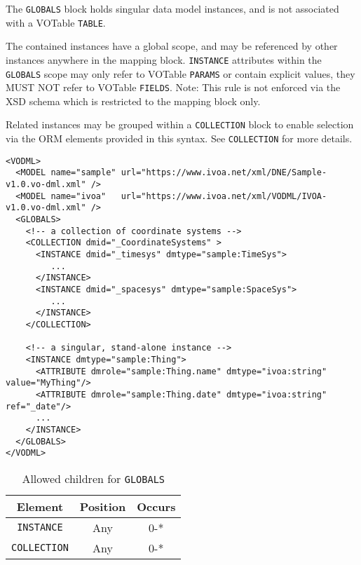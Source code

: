The \texttt{GLOBALS} block holds singular data model instances, and is not associated 
with a VOTable \texttt{TABLE}.

The contained instances have a global scope, and may be
referenced by other instances anywhere in the mapping block.  \texttt{INSTANCE} attributes
within the \texttt{GLOBALS} scope may only refer to VOTable \texttt{PARAMS} or contain
explicit values, they MUST NOT refer to VOTable \texttt{FIELDS}.  Note: This rule is not enforced
via the XSD schema which is restricted to the mapping block only.

Related instances may be grouped within a \texttt{COLLECTION} block to enable selection
via the ORM elements provided in this syntax.  See \texttt{COLLECTION} for more details.

\begin{lstlisting}[frame=single,caption={Example \texttt{GLOBALS} block},style=XML,basicstyle=\tiny]
<VODML>
  <MODEL name="sample" url="https://www.ivoa.net/xml/DNE/Sample-v1.0.vo-dml.xml" />
  <MODEL name="ivoa"   url="https://www.ivoa.net/xml/VODML/IVOA-v1.0.vo-dml.xml" />
  <GLOBALS>
    <!-- a collection of coordinate systems -->
    <COLLECTION dmid="_CoordinateSystems" >
      <INSTANCE dmid="_timesys" dmtype="sample:TimeSys">
         ...
      </INSTANCE>
      <INSTANCE dmid="_spacesys" dmtype="sample:SpaceSys">
         ...
      </INSTANCE>
    </COLLECTION>

    <!-- a singular, stand-alone instance -->
    <INSTANCE dmtype="sample:Thing">
      <ATTRIBUTE dmrole="sample:Thing.name" dmtype="ivoa:string" value="MyThing"/>
      <ATTRIBUTE dmrole="sample:Thing.date" dmtype="ivoa:string" ref="_date"/>
      ...
    </INSTANCE>
  </GLOBALS>
</VODML>
\end{lstlisting}


\begin{table}[!htbp]
  \small
  \centering
  \begin{tabulary}{\linewidth}{|c |c |c|}
    \hline 
        \textbf{Element} &
        \textbf{Position} &
        \textbf{Occurs}\\
    \hline
    \hline
        \texttt{INSTANCE} &
        Any &
        0-*\\
    \hline
        \texttt{COLLECTION} &
        Any &
        0-*\\
    \hline
  \end{tabulary}
  \caption{Allowed children for \texttt{GLOBALS}} 
  \label{tbl:globals-children}
 \end{table}
